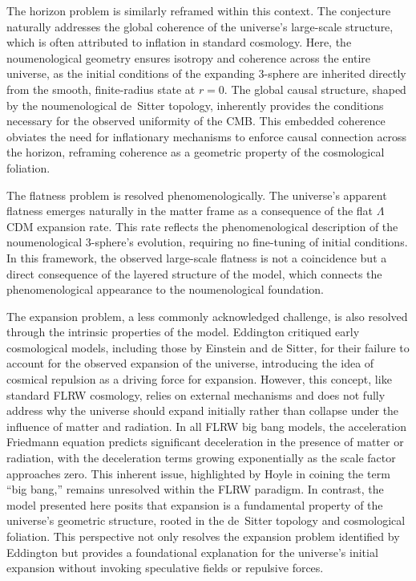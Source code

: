 \documentclass[aps,rmp,groupedaddress,twocolumn,10pt]{revtex4-2}
\begin{document}
The horizon problem is similarly reframed within this context. The conjecture naturally addresses the global coherence of the universe's large-scale structure, which is often attributed to inflation in standard cosmology. Here, the noumenological geometry ensures isotropy and coherence across the entire universe, as the initial conditions of the expanding 3-sphere are inherited directly from the smooth, finite-radius state at $r=0$. The global causal structure, shaped by the noumenological de~Sitter topology, inherently provides the conditions necessary for the observed uniformity of the CMB. This embedded coherence obviates the need for inflationary mechanisms to enforce causal connection across the horizon, reframing coherence as a geometric property of the cosmological foliation.

The flatness problem is resolved phenomenologically. The universe's apparent flatness emerges naturally in the matter frame as a consequence of the flat $\Lambda$CDM expansion rate. This rate reflects the phenomenological description of the noumenological 3-sphere's evolution, requiring no fine-tuning of initial conditions. In this framework, the observed large-scale flatness is not a coincidence but a direct consequence of the layered structure of the model, which connects the phenomenological appearance to the noumenological foundation.

The expansion problem, a less commonly acknowledged challenge, is also resolved through the intrinsic properties of the model. Eddington critiqued early cosmological models, including those by Einstein and de Sitter, for their failure to account for the observed expansion of the universe, introducing the idea of cosmical repulsion as a driving force for expansion. However, this concept, like standard FLRW cosmology, relies on external mechanisms and does not fully address why the universe should expand initially rather than collapse under the influence of matter and radiation. In all FLRW big bang models, the acceleration Friedmann equation predicts significant deceleration in the presence of matter or radiation, with the deceleration terms growing exponentially as the scale factor approaches zero. This inherent issue, highlighted by Hoyle in coining the term ``big bang,'' remains unresolved within the FLRW paradigm. In contrast, the model presented here posits that expansion is a fundamental property of the universe's geometric structure, rooted in the de~Sitter topology and cosmological foliation. This perspective not only resolves the expansion problem identified by Eddington but provides a foundational explanation for the universe's initial expansion without invoking speculative fields or repulsive forces.
\end{document}
